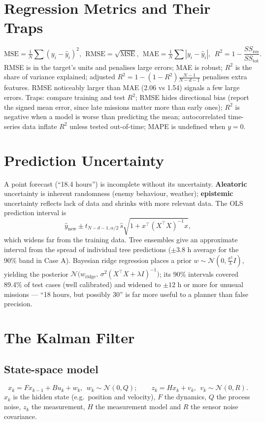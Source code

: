 \documentclass[11pt]{article}
\begin{document}
\section{Regression Metrics and Their Traps}
\[\text{MSE}=\tfrac1N\sum(y_i-\hat y_i)^2,\ \ \text{RMSE}=\sqrt{\text{MSE}},\ \ \text{MAE}=\tfrac1N\sum|y_i-\hat y_i|,\ \ R^2=1-\frac{SS_{\text{res}}}{SS_{\text{tot}}}.\]
RMSE is in the target's units and penalises large errors; MAE is robust; $R^2$ is the share of variance explained; adjusted $R^2=1-(1-R^2)\frac{N-1}{N-d-1}$ penalises extra features. RMSE noticeably larger than MAE (2.06 vs 1.54) signals a few large errors. Traps: compare training and test $R^2$; RMSE hides directional bias (report the signed mean error, since late missions matter more than early ones); $R^2$ is negative when a model is worse than predicting the mean; autocorrelated time-series data inflate $R^2$ unless tested out-of-time; MAPE is undefined when $y=0$.

\section{Prediction Uncertainty}
A point forecast (``18.4 hours'') is incomplete without its uncertainty. \textbf{Aleatoric} uncertainty is inherent randomness (enemy behaviour, weather); \textbf{epistemic} uncertainty reflects lack of data and shrinks with more relevant data. The OLS prediction interval is
\[\hat y_{\text{new}}\pm t_{N-d-1,\alpha/2}\,\hat s\sqrt{1+x^\top(X^\top X)^{-1}x},\]
which widens far from the training data. Tree ensembles give an approximate interval from the spread of individual tree predictions ($\pm3.8$ h average for the 90\% band in Case A). Bayesian ridge regression places a prior $w\sim\mathcal N(0,\tfrac{\sigma^2}{\lambda}I)$, yielding the posterior $\mathcal N\big(w_{\text{ridge}},\,\sigma^2(X^\top X+\lambda I)^{-1}\big)$; its 90\% intervals covered 89.4\% of test cases (well calibrated) and widened to $\pm12$ h or more for unusual missions --- ``18 hours, but possibly 30'' is far more useful to a planner than false precision.

\section{The Kalman Filter}
\subsection{State-space model}
\[x_k=Fx_{k-1}+Bu_k+w_k,\ \ w_k\sim\mathcal N(0,Q);\qquad z_k=Hx_k+v_k,\ \ v_k\sim\mathcal N(0,R).\]
$x_k$ is the hidden state (e.g.\ position and velocity), $F$ the dynamics, $Q$ the process noise, $z_k$ the measurement, $H$ the measurement model and $R$ the sensor noise covariance.
\end{document}
